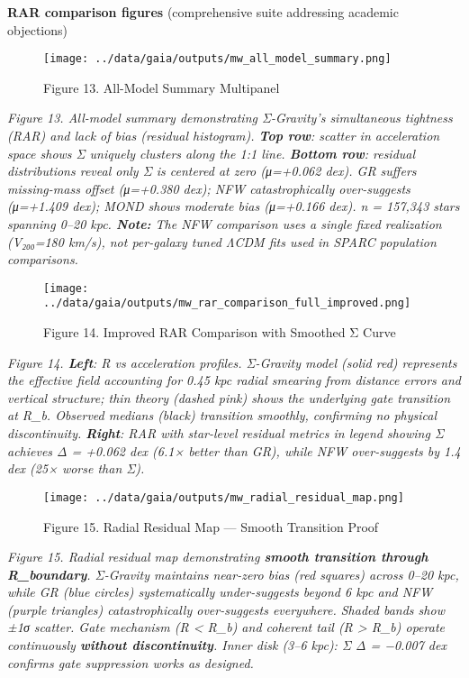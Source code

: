 \documentclass[11pt,a4paper]{article}
\begin{document}
\textbf{RAR comparison figures} (comprehensive suite addressing academic objections)


\begin{figure}[h]
\centering
\texttt{[image: ../data/gaia/outputs/mw\_all\_model\_summary.png]}
\caption{Figure 13. All-Model Summary Multipanel}
\end{figure}


\textit{Figure 13. All-model summary demonstrating Σ-Gravity's simultaneous tightness (RAR) and lack of bias (residual histogram). \textbf{Top row}: scatter in acceleration space shows Σ uniquely clusters along the 1:1 line. \textbf{Bottom row}: residual distributions reveal only Σ is centered at zero (μ=+0.062 dex). GR suffers missing-mass offset (μ=+0.380 dex); NFW catastrophically over-suggests (μ=+1.409 dex); MOND shows moderate bias (μ=+0.166 dex). n = 157,343 stars spanning 0–20 kpc. \textbf{Note:} The NFW comparison uses a single fixed realization (V₂₀₀=180 km/s), not per-galaxy tuned ΛCDM fits used in SPARC population comparisons.}


\begin{figure}[h]
\centering
\texttt{[image: ../data/gaia/outputs/mw\_rar\_comparison\_full\_improved.png]}
\caption{Figure 14. Improved RAR Comparison with Smoothed Σ Curve}
\end{figure}


\textit{Figure 14. \textbf{Left}: R vs acceleration profiles. Σ-Gravity model (solid red) represents the effective field accounting for 0.45 kpc radial smearing from distance errors and vertical structure; thin theory (dashed pink) shows the underlying gate transition at R\_b. Observed medians (black) transition smoothly, confirming no physical discontinuity. \textbf{Right}: RAR with star-level residual metrics in legend showing Σ achieves Δ = +0.062 dex (6.1× better than GR), while NFW over-suggests by 1.4 dex (25× worse than Σ).}


\begin{figure}[h]
\centering
\texttt{[image: ../data/gaia/outputs/mw\_radial\_residual\_map.png]}
\caption{Figure 15. Radial Residual Map — Smooth Transition Proof}
\end{figure}


\textit{Figure 15. Radial residual map demonstrating \textbf{smooth transition through R\_boundary}. Σ-Gravity maintains near-zero bias (red squares) across 0–20 kpc, while GR (blue circles) systematically under-suggests beyond 6 kpc and NFW (purple triangles) catastrophically over-suggests everywhere. Shaded bands show ±1σ scatter. Gate mechanism (R < R\_b) and coherent tail (R > R\_b) operate continuously \textbf{without discontinuity}. Inner disk (3–6 kpc): Σ Δ = −0.007 dex confirms gate suppression works as designed.}
\end{document}
